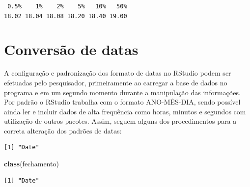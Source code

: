 \documentclass[12pt,brazil,oneside]{book}
\newenvironment{Shaded}{\begin{snugshade}}{\end{snugshade}}
\newcommand{\CommentTok}[1]{\textcolor[rgb]{0.56,0.35,0.01}{\textit{#1}}}
\newcommand{\DataTypeTok}[1]{\textcolor[rgb]{0.13,0.29,0.53}{#1}}
\newcommand{\KeywordTok}[1]{\textcolor[rgb]{0.13,0.29,0.53}{\textbf{#1}}}
\newcommand{\NormalTok}[1]{#1}
\newcommand{\StringTok}[1]{\textcolor[rgb]{0.31,0.60,0.02}{#1}}
\begin{document}
\begin{verbatim}
 0.5%    1%    2%    5%   10%   50% 
18.02 18.04 18.08 18.20 18.40 19.00 
\end{verbatim}

\hypertarget{conversao-de-datas}{%
\section{Conversão de datas}\label{conversao-de-datas}}

A configuração e padronização dos formato de datas no RStudio podem ser efetuadas pelo pesquisador, primeiramente ao carregar a base de dados no programa e em um segundo momento durante a manipulação das informações. Por padrão o RStudio trabalha com o formato ANO-MÊS-DIA, sendo possível ainda ler e incluir dados de alta frequência como horas, minutos e segundos com utilização de outros pacotes. Assim, seguem alguns dos procedimentos para a correta alteração dos padrões de datas:

\begin{Shaded}
\end{Shaded}

\begin{verbatim}
[1] "Date"
\end{verbatim}

\begin{Shaded}
\begin{Highlighting}[]
\KeywordTok{class}\NormalTok{(fechamento)}
\end{Highlighting}
\end{Shaded}

\begin{verbatim}
[1] "Date"
\end{verbatim}
\end{document}
